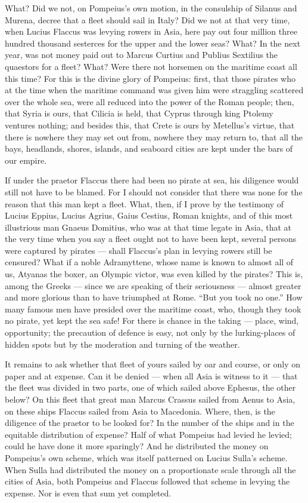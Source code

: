  What? Did we not, on Pompeius's own motion, in the consulship of Silanus and Murena, decree that a fleet should sail in Italy? Did we not at that very time, when Lucius Flaccus was levying rowers in Asia, here pay out four million three hundred thousand sesterces for the upper and the lower seas? What? In the next year, was not money paid out to Marcus Curtius and Publius Sextilius the quaestors for a fleet? What? Were there not horsemen on the maritime coast all this time? For this is the divine glory of Pompeius: first, that those pirates who at the time when the maritime command was given him were straggling scattered over the whole sea, were all reduced into the power of the Roman people; then, that Syria is ours, that Cilicia is held, that Cyprus through king Ptolemy ventures nothing; and besides this, that Crete is ours by Metellus's virtue, that there is nowhere they may set out from, nowhere they may return to, that all the bays, headlands, shores, islands, and seaboard cities are kept under the bars of our empire.

 If under the praetor Flaccus there had been no pirate at sea, his diligence would still not have to be blamed. For I should not consider that there was none for the reason that this man kept a fleet. What, then, if I prove by the testimony of Lucius Eppius, Lucius Agrius, Gaius Cestius, Roman knights, and of this most illustrious man Gnaeus Domitius, who was at that time legate in Asia, that at the very time when you say a fleet ought not to have been kept, several persons were captured by pirates --- shall Flaccus's plan in levying rowers still be censured? What if a noble Adramyttene, whose name is known to almost all of us, Atyanas the boxer, an Olympic victor, was even killed by the pirates? This is, among the Greeks --- since we are speaking of their seriousness --- almost greater and more glorious than to have triumphed at Rome. ``But you took no one.'' How many famous men have presided over the maritime coast, who, though they took no pirate, yet kept the sea safe! For there is chance in the taking --- place, wind, opportunity; the precaution of defence is easy, not only by the lurking-places of hidden spots but by the moderation and turning of the weather.

 It remains to ask whether that fleet of yours sailed by oar and course, or only on paper and at expense. Can it be denied --- when all Asia is witness to it --- that the fleet was divided in two parts, one of which sailed above Ephesus, the other below? On this fleet that great man Marcus Crassus sailed from Aenus to Asia, on these ships Flaccus sailed from Asia to Macedonia. Where, then, is the diligence of the praetor to be looked for? In the number of the ships and in the equitable distribution of expense? Half of what Pompeius had levied he levied; could he have done it more sparingly? And he distributed the money on Pompeius's own scheme, which was itself patterned on Lucius Sulla's scheme. When Sulla had distributed the money on a proportionate scale through all the cities of Asia, both Pompeius and Flaccus followed that scheme in levying the expense. Nor is even that sum yet completed.

